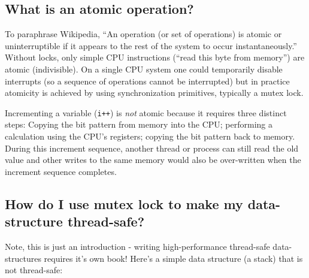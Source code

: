 \subsection{What is an atomic
operation?}\label{what-is-an-atomic-operation}

To paraphrase Wikipedia, ``An operation (or set of operations) is atomic
or uninterruptible if it appears to the rest of the system to occur
instantaneously.''\\Without locks, only simple CPU instructions (``read
this byte from memory'') are atomic (indivisible). On a single CPU
system one could temporarily disable interrupts (so a sequence of
operations cannot be interrupted) but in practice atomicity is achieved
by using synchronization primitives, typically a mutex lock.

Incrementing a variable (\texttt{i++}) is \emph{not} atomic because it
requires three distinct steps: Copying the bit pattern from memory into
the CPU; performing a calculation using the CPU's registers; copying the
bit pattern back to memory. During this increment sequence, another
thread or process can still read the old value and other writes to the
same memory would also be over-written when the increment sequence
completes.

\subsection{How do I use mutex lock to make my data-structure
thread-safe?}\label{how-do-i-use-mutex-lock-to-make-my-data-structure-thread-safe}

Note, this is just an introduction - writing high-performance
thread-safe data-structures requires it's own book! Here's a simple data
structure (a stack) that is not thread-safe:

\begin{Shaded}
\begin{Highlighting}[]
 
 

  
  
  \NormalTok{; \}}
\end{Highlighting}
\end{Shaded}

